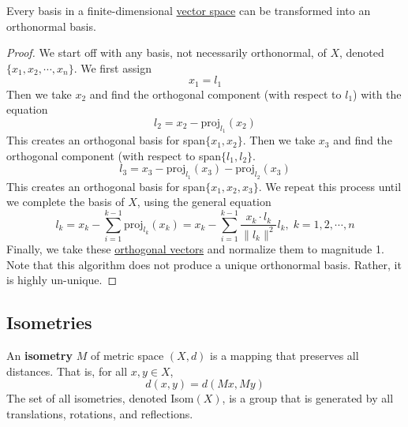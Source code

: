   \begin{theorem}
    \label{thm:gram-schmidt}
    Every basis in a finite-dimensional \hyperref[def:vector-space]{vector space} can be transformed into an orthonormal basis. 
  \end{theorem}
  \begin{proof}
		We start off with any basis, not necessarily orthonormal, of $X$, denoted $\{x_1, x_2, \cdots, x_n\}$. We first assign 
    \begin{equation}
      x_1 = l_1
    \end{equation}
    Then we take $x_2$ and find the orthogonal component (with respect to $l_1$) with the equation
    \begin{equation}
      l_2 = x_2 - \text{proj}_{l_1} (x_2)
    \end{equation}
    This creates an orthogonal basis for span$\{x_1, x_2\}$. Then we take $x_3$ and find the orthogonal component (with respect to span$\{l_1, l_2\}$. 
    \begin{equation}
      l_3 = x_3 - \text{proj}_{l_1} (x_3) - \text{proj}_{l_2} (x_3)
    \end{equation}
    This creates an orthogonal basis for span$\{x_1, x_2, x_3\}$. We repeat this process until we complete the basis of $X$, using the general equation
    \begin{equation}
      l_k = x_k - \sum_{i=1}^{k-1} \text{proj}_{l_k} (x_k) = x_k - \sum_{i=1}^{k-1} \frac{x_k \cdot l_k}{\|l_k\|^2} l_k, \; k = 1, 2, \cdots, n
    \end{equation}
    Finally, we take these \hyperref[def:orthogonal-vectors]{orthogonal vectors} and normalize them to magnitude 1. Note that this algorithm does not produce a unique orthonormal basis. Rather, it is highly un-unique. 
  \end{proof}

\subsection{Isometries}

  \begin{definition}[Isometry]
    \label{def:isometry}
    An \textbf{isometry} $M$ of metric space $(X, d)$ is a mapping that preserves all distances. That is, for all $x, y \in X$, 
    \begin{equation}
      d(x, y) = d(M x, M y) 
    \end{equation}
    The set of all isometries, denoted Isom$(X)$, is a group that is generated by all translations, rotations, and reflections. 
  \end{definition}

